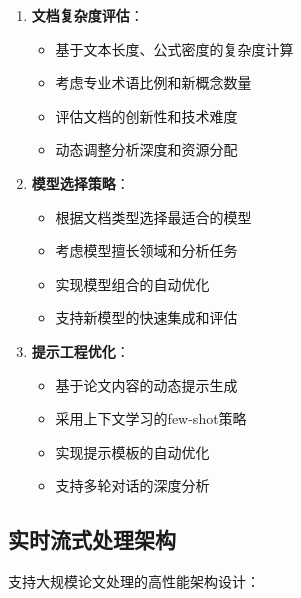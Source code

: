 \documentclass[12pt,a4paper]{article}
\begin{document}
\begin{enumerate}
    \item \textbf{文档复杂度评估}：
        \begin{itemize}
            \item 基于文本长度、公式密度的复杂度计算
            \item 考虑专业术语比例和新概念数量
            \item 评估文档的创新性和技术难度
            \item 动态调整分析深度和资源分配
        \end{itemize}
    
    \item \textbf{模型选择策略}：
        \begin{itemize}
            \item 根据文档类型选择最适合的模型
            \item 考虑模型擅长领域和分析任务
            \item 实现模型组合的自动优化
            \item 支持新模型的快速集成和评估
        \end{itemize}
    
    \item \textbf{提示工程优化}：
        \begin{itemize}
            \item 基于论文内容的动态提示生成
            \item 采用上下文学习的few-shot策略
            \item 实现提示模板的自动优化
            \item 支持多轮对话的深度分析
        \end{itemize}
\end{enumerate}

\subsection{实时流式处理架构}
支持大规模论文处理的高性能架构设计：
\end{document}
